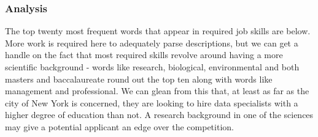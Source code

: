 \documentclass[]{article}
\newenvironment{Shaded}{\begin{snugshade}}{\end{snugshade}}
\newcommand{\ControlFlowTok}[1]{\textcolor[rgb]{0.13,0.29,0.53}{\textbf{#1}}}
\newcommand{\DataTypeTok}[1]{\textcolor[rgb]{0.13,0.29,0.53}{#1}}
\newcommand{\KeywordTok}[1]{\textcolor[rgb]{0.13,0.29,0.53}{\textbf{#1}}}
\newcommand{\NormalTok}[1]{#1}
\newcommand{\OperatorTok}[1]{\textcolor[rgb]{0.81,0.36,0.00}{\textbf{#1}}}
\newcommand{\StringTok}[1]{\textcolor[rgb]{0.31,0.60,0.02}{#1}}
\begin{document}
\begin{Shaded}
\end{Shaded}

\hypertarget{analysis}{%
\subsubsection{Analysis}\label{analysis}}

The top twenty most frequent words that appear in required job skills
are below. More work is required here to adequately parse descriptions,
but we can get a handle on the fact that most required skills revolve
around having a more scientific background - words like research,
biological, environmental and both masters and baccalaureate round out
the top ten along with words like management and professional. We can
glean from this that, at least as far as the city of New York is
concerned, they are looking to hire data specialists with a higher
degree of education than not. A research background in one of the
sciences may give a potential applicant an edge over the competition.
\end{document}

